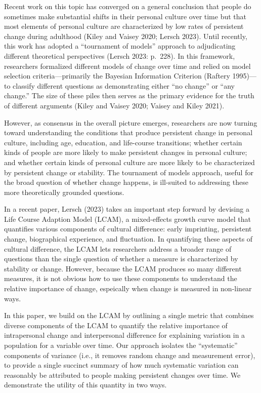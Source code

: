 \documentclass[
  12pt,
]{article}
\begin{document}
Recent work on this topic has converged on a general conclusion that
people do sometimes make substantial shifts in their personal culture
over time but that most elements of personal culture are characterized
by low rates of persistent change during adulthood (Kiley and Vaisey
2020; Lersch 2023). Until recently, this work has adopted a ``tournament
of models'' approach to adjudicating different theoretical perspectives
(Lersch 2023: p.~228). In this framework, researchers formalized
different models of change over time and relied on model selection
criteria---primarily the Bayesian Information Criterion (Raftery
1995)---to classify different questions as demonstrating either ``no
change'' or ``any change.'' The size of these piles then serves as the
primary evidence for the truth of different arguments (Kiley and Vaisey
2020; Vaisey and Kiley 2021).

However, as consensus in the overall picture emerges, researchers are
now turning toward understanding the conditions that produce persistent
change in personal culture, including age, education, and life-course
transitions; whether certain kinds of people are more likely to make
persistent changes in personal culture; and whether certain kinds of
personal culture are more likely to be characterized by persistent
change or stability. The tournament of models approach, useful for the
broad question of whether change happens, is ill-suited to addressing
these more theoretically grounded questions.

In a recent paper, Lersch (2023) takes an important step forward by
devising a Life Course Adaption Model (LCAM), a mixed-effects growth
curve model that quantifies various components of cultural difference:
early imprinting, persistent change, biographical experience, and
fluctuation. In quantifying these aspects of cultural difference, the
LCAM lets researchers address a broader range of questions than the
single question of whether a measure is characterized by stability or
change. However, because the LCAM produces so many different measures,
it is not obvious how to use these components to understand the relative
importance of change, espeically when change is measured in non-linear
ways.

In this paper, we build on the LCAM by outlining a single metric that
combines diverse components of the LCAM to quantify the relative
importance of intrapersonal change and interpersonal difference for
explaining variation in a population for a variable over time. Our
approach isolates the ``systematic'' components of variance (i.e., it
removes random change and measurement error), to provide a single
succinct summary of how much systematic variation can reasonably be
attributed to people making persistent changes over time. We demonstrate
the utility of this quantity in two ways.
\end{document}
